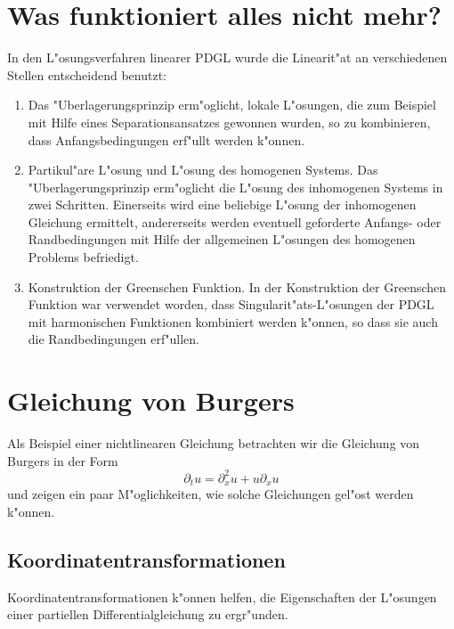 \section{Was funktioniert alles nicht mehr?}
In den L"osungsverfahren linearer PDGL wurde die Linearit"at an verschiedenen
Stellen entscheidend benutzt:
\begin{enumerate}
\item
Das "Uberlagerungsprinzip erm"oglicht, lokale L"osungen, die zum Beispiel
mit Hilfe eines Separationsansatzes gewonnen wurden, so zu kombinieren, dass
Anfangsbedingungen erf"ullt werden k"onnen.
\item
Partikul"are L"osung und L"osung des homogenen Systems.
Das "Uberlagerungsprinzip erm"oglicht die L"osung des inhomogenen Systems
in zwei Schritten. Einerseits wird eine beliebige L"osung der inhomogenen
Gleichung ermittelt, andererseits werden eventuell geforderte Anfangs-
oder Randbedingungen mit Hilfe der allgemeinen L"osungen des homogenen
Problems befriedigt.
\item
Konstruktion der Greenschen Funktion. In der Konstruktion der
Greenschen Funktion war verwendet worden, dass Singularit"ats-L"osungen 
der PDGL mit harmonischen Funktionen kombiniert werden k"onnen, so 
dass sie auch die Randbedingungen erf"ullen.
\end{enumerate}

\section{Gleichung von Burgers\label{burgers}}
Als Beispiel einer nichtlinearen Gleichung betrachten wir die Gleichung
von Burgers in der Form
\[
\partial_t u=\partial_x^2u+u\partial_xu
\]
und zeigen ein paar M"oglichkeiten, wie solche Gleichungen
gel"ost werden k"onnen.

\subsection{Koordinatentransformationen}
Koordinatentransformationen k"onnen helfen, die Eigenschaften der
L"osungen einer partiellen Differentialgleichung zu ergr"unden.

